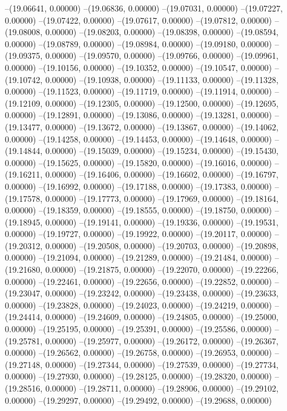 --(19.06641, 0.00000)
--(19.06836, 0.00000)
--(19.07031, 0.00000)
--(19.07227, 0.00000)
--(19.07422, 0.00000)
--(19.07617, 0.00000)
--(19.07812, 0.00000)
--(19.08008, 0.00000)
--(19.08203, 0.00000)
--(19.08398, 0.00000)
--(19.08594, 0.00000)
--(19.08789, 0.00000)
--(19.08984, 0.00000)
--(19.09180, 0.00000)
--(19.09375, 0.00000)
--(19.09570, 0.00000)
--(19.09766, 0.00000)
--(19.09961, 0.00000)
--(19.10156, 0.00000)
--(19.10352, 0.00000)
--(19.10547, 0.00000)
--(19.10742, 0.00000)
--(19.10938, 0.00000)
--(19.11133, 0.00000)
--(19.11328, 0.00000)
--(19.11523, 0.00000)
--(19.11719, 0.00000)
--(19.11914, 0.00000)
--(19.12109, 0.00000)
--(19.12305, 0.00000)
--(19.12500, 0.00000)
--(19.12695, 0.00000)
--(19.12891, 0.00000)
--(19.13086, 0.00000)
--(19.13281, 0.00000)
--(19.13477, 0.00000)
--(19.13672, 0.00000)
--(19.13867, 0.00000)
--(19.14062, 0.00000)
--(19.14258, 0.00000)
--(19.14453, 0.00000)
--(19.14648, 0.00000)
--(19.14844, 0.00000)
--(19.15039, 0.00000)
--(19.15234, 0.00000)
--(19.15430, 0.00000)
--(19.15625, 0.00000)
--(19.15820, 0.00000)
--(19.16016, 0.00000)
--(19.16211, 0.00000)
--(19.16406, 0.00000)
--(19.16602, 0.00000)
--(19.16797, 0.00000)
--(19.16992, 0.00000)
--(19.17188, 0.00000)
--(19.17383, 0.00000)
--(19.17578, 0.00000)
--(19.17773, 0.00000)
--(19.17969, 0.00000)
--(19.18164, 0.00000)
--(19.18359, 0.00000)
--(19.18555, 0.00000)
--(19.18750, 0.00000)
--(19.18945, 0.00000)
--(19.19141, 0.00000)
--(19.19336, 0.00000)
--(19.19531, 0.00000)
--(19.19727, 0.00000)
--(19.19922, 0.00000)
--(19.20117, 0.00000)
--(19.20312, 0.00000)
--(19.20508, 0.00000)
--(19.20703, 0.00000)
--(19.20898, 0.00000)
--(19.21094, 0.00000)
--(19.21289, 0.00000)
--(19.21484, 0.00000)
--(19.21680, 0.00000)
--(19.21875, 0.00000)
--(19.22070, 0.00000)
--(19.22266, 0.00000)
--(19.22461, 0.00000)
--(19.22656, 0.00000)
--(19.22852, 0.00000)
--(19.23047, 0.00000)
--(19.23242, 0.00000)
--(19.23438, 0.00000)
--(19.23633, 0.00000)
--(19.23828, 0.00000)
--(19.24023, 0.00000)
--(19.24219, 0.00000)
--(19.24414, 0.00000)
--(19.24609, 0.00000)
--(19.24805, 0.00000)
--(19.25000, 0.00000)
--(19.25195, 0.00000)
--(19.25391, 0.00000)
--(19.25586, 0.00000)
--(19.25781, 0.00000)
--(19.25977, 0.00000)
--(19.26172, 0.00000)
--(19.26367, 0.00000)
--(19.26562, 0.00000)
--(19.26758, 0.00000)
--(19.26953, 0.00000)
--(19.27148, 0.00000)
--(19.27344, 0.00000)
--(19.27539, 0.00000)
--(19.27734, 0.00000)
--(19.27930, 0.00000)
--(19.28125, 0.00000)
--(19.28320, 0.00000)
--(19.28516, 0.00000)
--(19.28711, 0.00000)
--(19.28906, 0.00000)
--(19.29102, 0.00000)
--(19.29297, 0.00000)
--(19.29492, 0.00000)
--(19.29688, 0.00000)
